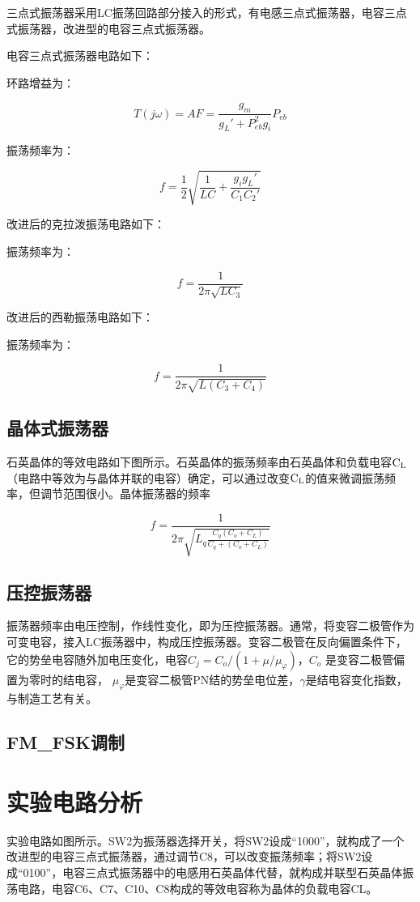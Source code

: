 \documentclass{../source/Experiment}
\begin{document}
三点式振荡器采用LC振荡回路部分接入的形式，有电感三点式振荡器，电容三点式振荡器，改进型的电容三点式振荡器。

电容三点式振荡器电路如下：

环路增益为：

$$
    T(j\omega) = AF = \frac{g_m}{g_L' + P_{eb}^2g_i}P_{eb}
$$

振荡频率为：

$$
    f = \frac{1}{2}\sqrt{\frac{1}{LC} + \frac{g_ig_L'}{C_1C_2'}}
$$

改进后的克拉泼振荡电路如下：

振荡频率为：

$$
    f = \frac{1}{2\pi\sqrt{LC_3}}
$$

改进后的西勒振荡电路如下：

振荡频率为：

$$
    f = \frac{1}{2\pi\sqrt{L(C_3+C_4)}}
$$


\subsection{晶体式振荡器}
石英晶体的等效电路如下图所示。石英晶体的振荡频率由石英晶体和负载电容$\rm C_L$（电路中等效为与晶体并联的电容）确定，可以通过改变$\rm C_L$的值来微调振荡频率，但调节范围很小。晶体振荡器的频率

$$
    f = \frac{1}{2\pi\sqrt{L_q\frac{C_q(C_o+C_L)}{C_q+(C_o+C_L)}}}
$$

\subsection{压控振荡器}
振荡器频率由电压控制，作线性变化，即为压控振荡器。通常，将变容二极管作为可变电容，接入LC振荡器中，构成压控振荡器。变容二极管在反向偏置条件下，它的势垒电容随外加电压变化，电容$C_j = C_o/(1+\mu/\mu_{\varphi})$，$C_o$ 是变容二极管偏置为零时的结电容， $\mu_\varphi$是变容二极管PN结的势垒电位差，$\gamma$是结电容变化指数，与制造工艺有关。

\subsection{FM\_FSK调制}

\section{实验电路分析}

实验电路如图所示。SW2为振荡器选择开关，将SW2设成“1000”，就构成了一个改进型的电容三点式振荡器，通过调节C8，可以改变振荡频率；将SW2设成“0100”，电容三点式振荡器中的电感用石英晶体代替，就构成并联型石英晶体振荡电路，电容C6、C7、C10、C8构成的等效电容称为晶体的负载电容CL。
\end{document}
